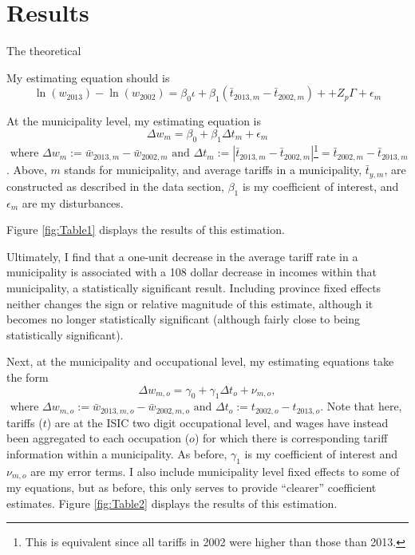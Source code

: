 \documentclass[12pt]{article}
\begin{document}
\vspace{-10pt}
\section{Results}
\label{sec:Results}
%

\citep{amiti2012trade}

The theoretical 


My estimating equation should is 
\begin{equation}
\ln(w_{2013})- \ln(w_{2002}) = \beta_0 \iota + \beta_1( \bar{t}_{2013,m}-\bar{t}_{2002,m})+
+Z_p \Gamma + \epsilon_m
\end{equation}




At the municipality level, my estimating equation is 
\begin{equation}
\Delta w_m = \beta_0 + \beta_1 \Delta t_m + \epsilon_m 
\end{equation}
$\text{~where~}
\Delta w_m := \bar{w}_{2013,m} - \bar{w}_{2002,m} \text{~and~} \Delta t_m := 
\left|\bar{t}_{2013,m}-\bar{t}_{2002,m} \right|$\footnote{This is equivalent
since all tariffs in 2002 were higher than those than 2013.}$= \bar{t}_{2002,m}-\bar{t}_{2013,m}$.
Above, $m$ stands for municipality, and average tariffs in a municipality, $\bar{t}_{y,m}$, 
are constructed as described in the data section, $\beta_1$ is my coefficient of interest,
and $\epsilon_m$ are my disturbances.
 
Figure \ref{fig:Table1} displays the results of this estimation.

Ultimately, I find that a one-unit decrease in the average tariff rate in a municipality
is associated with a 108 dollar decrease in incomes within that municipality, a 
statistically significant result. Including province fixed effects neither changes the 
sign or relative magnitude of this estimate, although it becomes no longer statistically
significant (although fairly close to being statistically significant).

Next, at the municipality and occupational level, my estimating equations take the form
\begin{equation}
\Delta w_{m,o} = \gamma_0 + \gamma_1 \Delta t_o + \nu_{m,o},
\end{equation}
$\text{~where~}
\Delta w_{m,o} := \bar{w}_{2013,m,o} - \bar{w}_{2002,m,o} \text{~and~} 
\Delta t_o := t_{2002,o}-t_{2013,o}$.
Note that here, tariffs ($t$) are at the ISIC two digit occupational level, and wages 
have instead been aggregated to each occupation ($o$) for which there is
corresponding tariff information within a municipality. As before, $\gamma_1$ is
my coefficient of interest and $\nu_{m,o}$ are my error terms.
I also include municipality level fixed effects to some of my equations, but
as before, this only serves to provide ``clearer'' coefficient estimates.
Figure \ref{fig:Table2} displays the results of this estimation.
\end{document}
